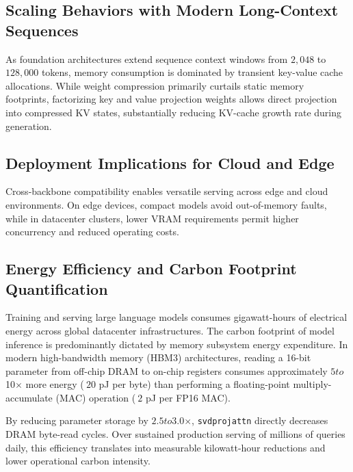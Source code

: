 \subsection{Scaling Behaviors with Modern Long-Context Sequences}
As foundation architectures extend sequence context windows from $2{,}048$ to $128{,}000$ tokens, memory consumption is dominated by transient key-value cache allocations. While weight compression primarily curtails static memory footprints, factorizing key and value projection weights allows direct projection into compressed KV states, substantially reducing KV-cache growth rate during generation.

\subsection{Deployment Implications for Cloud and Edge}
Cross-backbone compatibility enables versatile serving across edge and cloud environments. On edge devices, compact models avoid out-of-memory faults, while in datacenter clusters, lower VRAM requirements permit higher concurrency and reduced operating costs.

\subsection{Energy Efficiency and Carbon Footprint Quantification}
Training and serving large language models consumes gigawatt-hours of electrical energy across global datacenter infrastructures. The carbon footprint of model inference is predominantly dictated by memory subsystem energy expenditure. In modern high-bandwidth memory (HBM3) architectures, reading a 16-bit parameter from off-chip DRAM to on-chip registers consumes approximately $5$\times$ to $10$\times$ more energy ($~20$ pJ per byte) than performing a floating-point multiply-accumulate (MAC) operation ($~2$ pJ per FP16 MAC).

By reducing parameter storage by $2.5$\times$ to $3.0$\times$, \texttt{svdprojattn} directly decreases DRAM byte-read cycles. Over sustained production serving of millions of queries daily, this efficiency translates into measurable kilowatt-hour reductions and lower operational carbon intensity.
